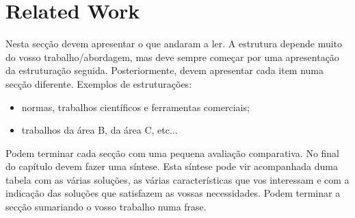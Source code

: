 \chapter{Related Work}\label{relatedwork}
Nesta secção devem apresentar o que andaram a ler. A estrutura depende muito do
vosso trabalho/abordagem, mas deve sempre começar por uma apresentação da
estruturação seguida. Posteriormente, devem apresentar cada item numa secção
diferente. Exemplos de estruturações:
\begin{itemize}
\item normas, trabalhos científicos e ferramentas comerciais;
\item trabalhos da área B, da área C, etc...
\end{itemize}
Podem terminar cada secção com uma pequena avaliação comparativa.
No final do capítulo devem fazer uma síntese. Esta síntese pode vir acompanhada
duma tabela com as várias soluções, as várias características que vos interessam
e com a indicação das soluções que satisfazem as vossas necessidades. Podem
terminar a secção sumariando o vosso trabalho numa frase.
